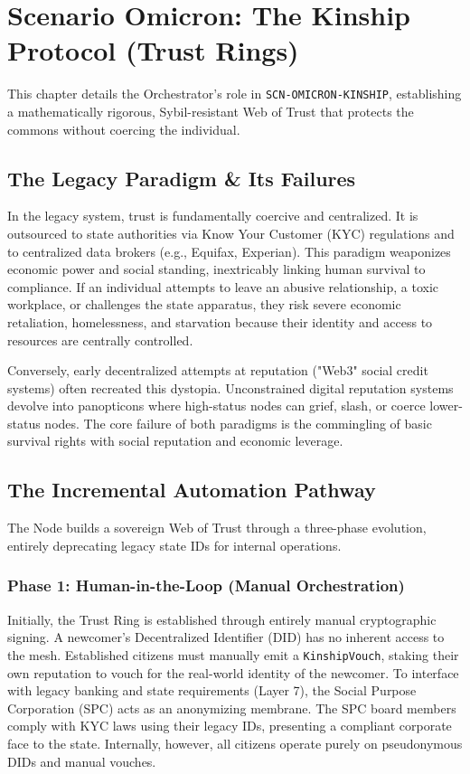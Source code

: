 \chapter{Scenario Omicron: The Kinship Protocol (Trust Rings)}
\label{ch:scenario_omicron}

This chapter details the Orchestrator's role in \texttt{SCN-OMICRON-KINSHIP}, establishing a mathematically rigorous, Sybil-resistant Web of Trust that protects the commons without coercing the individual.

\section{The Legacy Paradigm \& Its Failures}
In the legacy system, trust is fundamentally coercive and centralized. It is outsourced to state authorities via Know Your Customer (KYC) regulations and to centralized data brokers (e.g., Equifax, Experian). This paradigm weaponizes economic power and social standing, inextricably linking human survival to compliance. If an individual attempts to leave an abusive relationship, a toxic workplace, or challenges the state apparatus, they risk severe economic retaliation, homelessness, and starvation because their identity and access to resources are centrally controlled.

Conversely, early decentralized attempts at reputation ("Web3" social credit systems) often recreated this dystopia. Unconstrained digital reputation systems devolve into panopticons where high-status nodes can grief, slash, or coerce lower-status nodes. The core failure of both paradigms is the commingling of basic survival rights with social reputation and economic leverage.

\section{The Incremental Automation Pathway}
The Node builds a sovereign Web of Trust through a three-phase evolution, entirely deprecating legacy state IDs for internal operations.

\subsection{Phase 1: Human-in-the-Loop (Manual Orchestration)}
Initially, the Trust Ring is established through entirely manual cryptographic signing. A newcomer's Decentralized Identifier (DID) has no inherent access to the mesh. Established citizens must manually emit a \texttt{KinshipVouch}, staking their own reputation to vouch for the real-world identity of the newcomer.
To interface with legacy banking and state requirements (Layer 7), the Social Purpose Corporation (SPC) acts as an anonymizing membrane. The SPC board members comply with KYC laws using their legacy IDs, presenting a compliant corporate face to the state. Internally, however, all citizens operate purely on pseudonymous DIDs and manual vouches.

